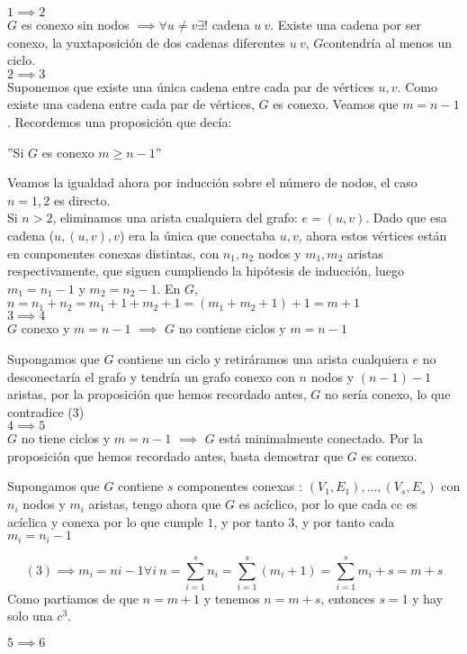 \documentclass[openany]{book}
\begin{document}
\begin{demonstration}
    $ 1 \implies 2 $\\

    $ G $ es conexo sin nodos $ \implies  \forall u \ne v \exists! $ cadena $ u ~ v $. Existe una cadena por ser conexo, la yuxtaposición de dos cadenas diferentes $ u ~ v $, $  G $contendría al menos un ciclo.\\
    $ 2 \implies 3 $\\
    
    Suponemos que existe una única cadena entre cada par de vértices $ u,v $. Como existe una cadena entre cada par de vértices, $ G $ es conexo. Veamos que $ m = n-1 $. Recordemos una proposición que decía:

    ''Si $ G $ es conexo $ m \geq n-1 $''

    Veamos la igualdad ahora por inducción sobre el número de nodos, el caso $ n = 1,2 $ es directo.\\
    Si $ n>2 $, eliminamos una arista cualquiera del grafo: $ e =(u,v)$. Dado que esa cadena ($ u,(u,v),v $) era la única que conectaba $ u,v $, ahora estos vértices están en componentes conexas distintas, con $ n_1,n_2 $ nodos y $ m_1,m_2 $ aristas respectivamente, que siguen cumpliendo la hipótesis de inducción, luego $ m_1 = n_1-1 $ y $ m_2 =n_2-1 $. En $ G $, $ n = n_1+n_2=m_1+1+m_2+1 = (m_1+m_2+1) +1 = m+1 $\\
    $ 3 \implies 4 $\\

    $G$ conexo y $m = n-1$ $\implies$ $G$ no contiene ciclos y $ m = n-1 $

    Supongamos que $G$ contiene un ciclo y retiráramos una arista cualquiera $e$ no desconectaría el grafo y tendría un grafo conexo con $n$ nodos y $(n-1) - 1$ aristas, por la proposición que hemos recordado antes, $ G $ no sería conexo, lo que contradice (3)\\
    $ 4 \implies 5 $\\

    $G$ no tiene ciclos y $m=n-1$ $\implies$ $G$ está minimalmente conectado. Por la proposición que hemos recordado antes, basta demostrar que $G$ es conexo.

    Supongamos que $G$ contiene $s$ componentes conexas : $ (V_1,E_1),...,(V_s,E_s) $ con $ n_i $ nodos y $ m_i $ aristas, tengo ahora que $G$ es acíclico, por lo que cada cc es acíclica y conexa por lo que cumple $1$, y por tanto $3$, y por tanto cada $m_{i}= n_i-1$

    $$ (3) \implies m_i = n{i-1} \forall i\ n = \sum\limits_{i=1}^{s}n_i = \sum\limits_{i=1}^{s}(m_i+1) = \sum\limits_{i=1}^{s}m_i+s = m+s $$
    Como partiamos de que $n = m + 1$ y tenemos $n = m + s$, entonces $s=1$ y hay solo una $c^3$.
    
    $ 5 \implies 6 $\\ 


\end{demonstration}
\end{document}
